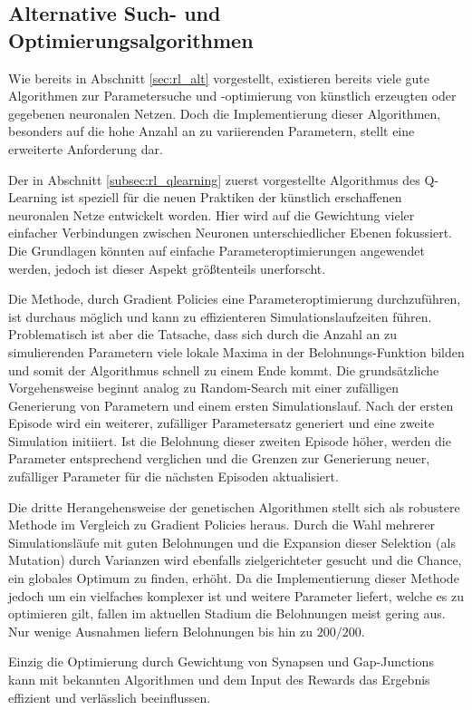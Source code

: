 	\subsection{Alternative Such- und Optimierungsalgorithmen}
		Wie bereits in Abschnitt \ref{sec:rl_alt} vorgestellt, existieren bereits viele gute Algorithmen zur Parametersuche und -optimierung von künstlich erzeugten oder gegebenen neuronalen Netzen. Doch die Implementierung dieser Algorithmen, besonders auf die hohe Anzahl an zu variierenden Parametern, stellt eine erweiterte Anforderung dar.
		
		Der in Abschnitt \ref{subsec:rl_qlearning} zuerst vorgestellte Algorithmus des Q-Learning ist speziell für die neuen Praktiken der künstlich erschaffenen neuronalen Netze entwickelt worden. Hier wird auf die Gewichtung vieler einfacher Verbindungen zwischen Neuronen unterschiedlicher Ebenen fokussiert. Die Grundlagen könnten auf einfache Parameteroptimierungen angewendet werden, jedoch ist dieser Aspekt größtenteils unerforscht.
		
		Die Methode, durch Gradient Policies eine Parameteroptimierung durchzuführen, ist durchaus möglich und kann zu effizienteren Simulationslaufzeiten führen. Problematisch ist aber die Tatsache, dass sich durch die Anzahl an zu simulierenden Parametern viele lokale Maxima in der Belohnungs-Funktion bilden und somit der Algorithmus schnell zu einem Ende kommt. Die grundsätzliche Vorgehensweise beginnt analog zu Random-Search mit einer zufälligen Generierung von Parametern und einem ersten Simulationslauf. Nach der ersten Episode wird ein weiterer, zufälliger Parametersatz generiert und eine zweite Simulation initiiert. Ist die Belohnung dieser zweiten Episode höher, werden die Parameter entsprechend verglichen und die Grenzen zur Generierung neuer, zufälliger Parameter für die nächsten Episoden aktualisiert.
		
		Die dritte Herangehensweise der genetischen Algorithmen stellt sich als robustere Methode im Vergleich zu Gradient Policies heraus. Durch die Wahl mehrerer Simulationsläufe mit guten Belohnungen und die Expansion dieser Selektion (als Mutation) durch Varianzen wird ebenfalls zielgerichteter gesucht und die Chance, ein globales Optimum zu finden, erhöht. Da die Implementierung dieser Methode jedoch um ein vielfaches komplexer ist und weitere Parameter liefert, welche es zu optimieren gilt, fallen im aktuellen Stadium die Belohnungen meist gering aus. Nur wenige Ausnahmen liefern Belohnungen bis hin zu $200/200$.
		
		Einzig die Optimierung durch Gewichtung von Synapsen und Gap-Junctions kann mit bekannten Algorithmen und dem Input des Rewards das Ergebnis effizient und verlässlich beeinflussen.

